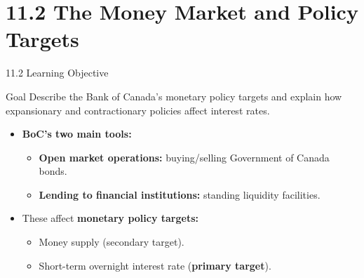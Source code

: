 \documentclass[aspectratio=169]{beamer}
\begin{document}
\section{11.2 The Money Market and Policy Targets}

\begin{frame}{11.2 Learning Objective}
\transfade
\begin{block}{Goal}
Describe the Bank of Canada's monetary policy targets and explain how expansionary and contractionary policies affect interest rates.
\end{block}
\begin{itemize}
  \item \textbf{BoC's two main tools:}
  \begin{itemize}
    \item \textbf{Open market operations:} buying/selling Government of Canada bonds.
    \item \textbf{Lending to financial institutions:} standing liquidity facilities.
  \end{itemize}
  \item These affect \textbf{monetary policy targets:}
  \begin{itemize}
    \item Money supply (secondary target).
    \item Short-term overnight interest rate (\textbf{primary target}).
  \end{itemize}
\end{itemize}
\end{frame}
\end{document}
